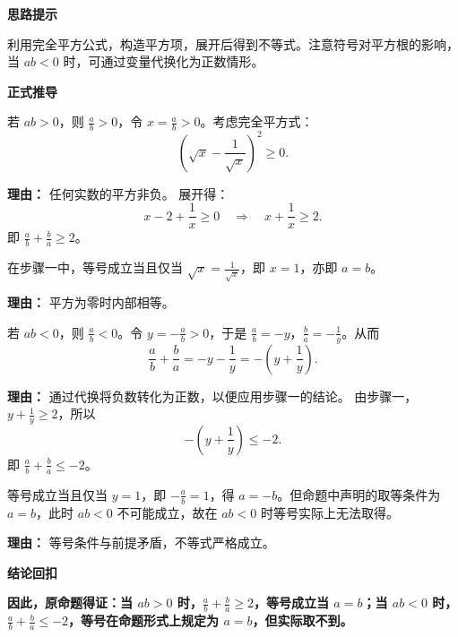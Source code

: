 \begin{proofbox}
\textbf{\textcolor{CProof}{思路提示}}

利用完全平方公式，构造平方项，展开后得到不等式。注意符号对平方根的影响，当 $ab<0$ 时，可通过变量代换化为正数情形。

\medskip
\textbf{\textcolor{CProof}{正式推导}}
\begin{description}[style=nextline, leftmargin=2.8em, labelsep=0.5em, itemsep=0.55em]
    \item[\textbf{步骤一（同号证明）：}] 若 $ab > 0$，则 $\frac{a}{b} > 0$，令 $x = \frac{a}{b} > 0$。考虑完全平方式：
    \[
    \left( \sqrt{x} - \frac{1}{\sqrt{x}} \right)^2 \geq 0.
    \]
    \par\textbf{理由：} 任何实数的平方非负。
    展开得：
    \[
    x - 2 + \frac{1}{x} \geq 0 \quad \Rightarrow \quad x + \frac{1}{x} \geq 2.
    \]
    即 $\frac{a}{b} + \frac{b}{a} \geq 2$。

    \item[\textbf{步骤二（同号取等）：}] 在步骤一中，等号成立当且仅当 $\sqrt{x} = \frac{1}{\sqrt{x}}$，即 $x = 1$，亦即 $a = b$。
    \par\textbf{理由：} 平方为零时内部相等。

    \item[\textbf{步骤三（异号证明）：}] 若 $ab < 0$，则 $\frac{a}{b} < 0$。令 $y = -\frac{a}{b} > 0$，于是 $\frac{a}{b} = -y$，$\frac{b}{a} = -\frac{1}{y}$。从而
    \[
    \frac{a}{b} + \frac{b}{a} = -y - \frac{1}{y} = -\left( y + \frac{1}{y} \right).
    \]
    \par\textbf{理由：} 通过代换将负数转化为正数，以便应用步骤一的结论。
    由步骤一，$y + \frac{1}{y} \geq 2$，所以
    \[
    -\left( y + \frac{1}{y} \right) \leq -2.
    \]
    即 $\frac{a}{b} + \frac{b}{a} \leq -2$。

    \item[\textbf{步骤四（异号取等）：}] 等号成立当且仅当 $y = 1$，即 $-\frac{a}{b} = 1$，得 $a = -b$。但命题中声明的取等条件为 $a = b$，此时 $ab < 0$ 不可能成立，故在 $ab<0$ 时等号实际上无法取得。
    \par\textbf{理由：} 等号条件与前提矛盾，不等式严格成立。
\end{description}

\medskip
\textbf{\textcolor{CProof}{结论回扣}}

\textbf{因此，原命题得证：当 $ab>0$ 时，$\frac{a}{b}+\frac{b}{a} \geq 2$，等号成立当 $a=b$；当 $ab<0$ 时，$\frac{a}{b}+\frac{b}{a} \leq -2$，等号在命题形式上规定为 $a=b$，但实际取不到。}
\end{proofbox}
